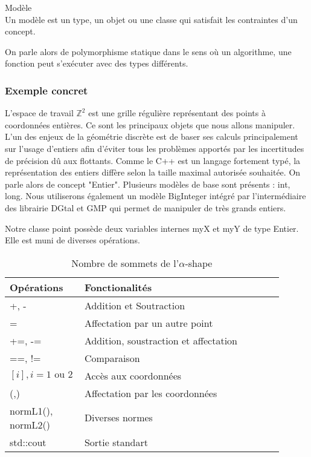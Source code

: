 \begin{Definition}{Modèle}\\
  Un modèle est un type, un objet ou une classe qui satisfait les contraintes d'un concept.
\label{def:cpp-mod}

\end{Definition}

On parle alors de polymorphisme statique dans le sens où un algorithme, une fonction peut s'exécuter avec des types différents.

\subsubsection{Exemple concret}

L'espace de travail $\mathbb{Z}^{2}$ est une grille régulière représentant des points à coordonnées entières. Ce sont les principaux objets que nous allons manipuler. L'un des enjeux de la géométrie discrète est de baser ses calculs principalement sur l'usage d'entiers afin d'éviter tous les problèmes apportés par les incertitudes de précision dû aux flottants. Comme le C++ est un langage fortement typé, la représentation des entiers diffère selon la taille maximal autorisée souhaitée. On parle alors de concept "Entier". Plusieurs modèles de base sont présents : int, long. Nous utiliserons également un modèle BigInteger intégré par l'intermédiaire des librairie DGtal et GMP qui permet de manipuler de très grands entiers.


Notre classe point possède deux variables internes myX et myY de type Entier. Elle est muni de diverses opérations.

\begin{table}[H]
  \begin{tabular}{|p{0.2\linewidth}|p{0.7\linewidth}|}
    \hline
     Opérations & Fonctionalités\\ 
    \hline
    +, -               & Addition et Soutraction\\
    =                  & Affectation par un autre point\\
    +=, -=             & Addition, soustraction et affectation\\
    ==, !=             & Comparaison\\
    $[i], i = 1 \text{ ou } 2$     & Accès aux coordonnées\\
    (,)                & Affectation par les coordonnées\\
    normL1(), normL2() & Diverses normes\\
    std::cout          & Sortie standart\\
    \hline
  \end{tabular} 
  \caption{Nombre de sommets de l'$\alpha$-shape}
\end{table}

